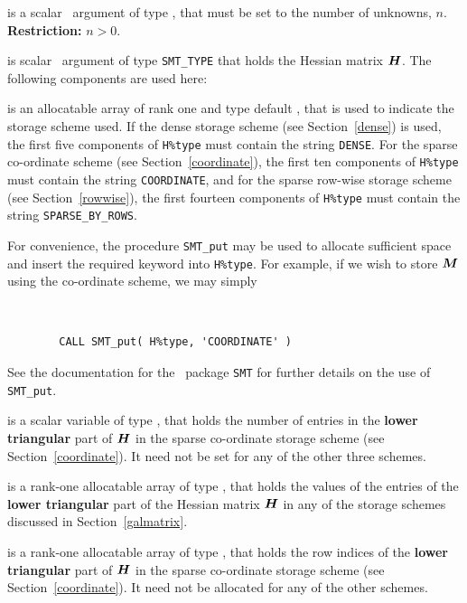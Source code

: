\documentclass{galahad}
\begin{document}
\begin{description}

 is a scalar \intentin\ argument of type \integer, that must be
set to the number of unknowns, $n$. {\bf Restriction: } $n  >  0$.

 is scalar \intentin\ argument of type {\tt SMT\_TYPE}
that holds the Hessian matrix ${\bm{H}}$. The following components
are used here:

\begin{description}

 is an allocatable array of rank one and type default
\character, that
is used to indicate the storage scheme used. If the dense storage scheme
(see Section~\ref{dense}) is used,
the first five components of {\tt H\%type} must contain the
string {\tt DENSE}.
For the sparse co-ordinate scheme (see Section~\ref{coordinate}),
the first ten components of {\tt H\%type} must contain the
string {\tt COORDINATE},
and for the sparse row-wise storage scheme (see Section~\ref{rowwise}),
the first fourteen components of {\tt H\%type} must contain the
string {\tt SPARSE\_BY\_ROWS}.

For convenience, the procedure {\tt SMT\_put}
may be used to allocate sufficient space and insert the required keyword
into {\tt H\%type}.
For example, if we wish to store ${\bm{M}}$ using the co-ordinate scheme,
we may simply
{\tt
\begin{verbatim}
        CALL SMT_put( H%type, 'COORDINATE' )
\end{verbatim}
}
\noindent
See the documentation for the \galahad\ package {\tt SMT}
for further details on the use of {\tt SMT\_put}.

 is a scalar variable of type \integer, that
holds the number of entries in the {\bf lower triangular} part of ${\bm{H}}$
in the sparse co-ordinate storage scheme (see Section~\ref{coordinate}).
It need not be set for any of the other three schemes.

 is a rank-one allocatable array of type \realdp, that holds
the values of the entries of the {\bf lower triangular} part
of the Hessian matrix ${\bm{H}}$ in any of the
storage schemes discussed in Section~\ref{galmatrix}.

 is a rank-one allocatable array of type \integer,
that holds the row indices of the {\bf lower triangular} part of ${\bm{H}}$
in the sparse co-ordinate storage
scheme (see Section~\ref{coordinate}).
It need not be allocated for any of the other schemes.


\end{description}
\end{description}
\end{document}
